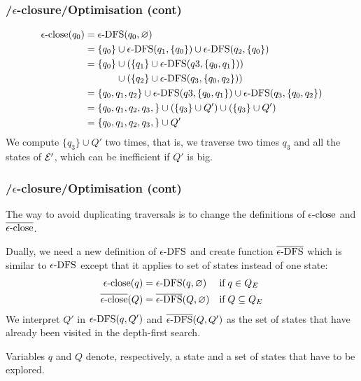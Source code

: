 %
\begin{frame}
\frametitle{\eNFA{}/\(\epsilon\)-closure/Optimisation (cont)}

\begin{align*}
   \eClose (q_0)
&= \eDFS (q_0, \varnothing)\\
&= \{q_0\} \cup \eDFS (q_1, \{q_0\}) \cup \eDFS (q_2, \{q_0\})\\
&= \{q_0\} \cup (\{q_1\} \cup \eDFS (q3, \{q_0, q_1\}))\\
&\mathrel{\phantom{=}} \phantom{\{q_0\}}{} \cup (\{q_2\} \cup \eDFS
   (q_3, \{q_0, q_2\}))\\
&= \{q_0, q_1, q_2\} \cup \eDFS (q3, \{q_0, q_1\}) \cup \eDFS
   (q_3, \{q_0, q_2\})\\
&= \{q_0, q_1, q_2, q_3,\} \cup (\{q_3\} \cup Q') \cup (\{q_3\} \cup Q')\\
&= \{q_0, q_1, q_2, q_3,\} \cup Q'
\end{align*}
We compute \(\{q_3\} \cup Q'\) two times, that is, we traverse two
times \(q_3\) and all the states of \(\cal E'\), which can be
inefficient if \(Q'\) is big.

\end{frame}

%
\begin{frame}
\frametitle{\eNFA{}/\(\epsilon\)-closure/Optimisation (cont)}

The way to avoid duplicating traversals is to change the definitions
of \(\epsilon\text{-close}\) and \(\overline{\epsilon\text{-close}}\).

Dually, we need a new definition of \(\epsilon\text{-DFS}\) and create function
\(\overline{\epsilon\text{-DFS}}\) which is similar to \(\epsilon\text{-DFS}\) except that it applies to
set of states instead of one state:
\begin{align*}
   \epsilon\text{-close} (q)
&= \epsilon\text{-DFS} (q, \varnothing)
&& \text{if} \; q \in Q_E\\
   \overline{\epsilon\text{-close}} (Q)
&= \overline{\epsilon\text{-DFS}} (Q, \varnothing)
&& \text{if} \; Q \subseteq Q_E
\end{align*}
We interpret \(Q'\) in \(\epsilon\text{-DFS} (q, Q')\) and \(\overline{\epsilon\text{-DFS}} (Q, Q')\) as
the set of states that have already been visited in the depth-first
search.

\bigskip

Variables \(q\) and \(Q\) denote, respectively, a state and a set of
states that have to be explored.

\end{frame}

